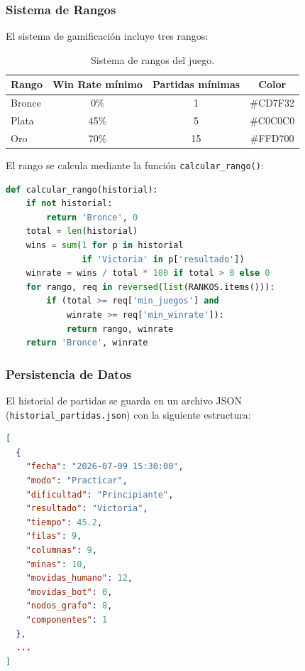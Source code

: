 \documentclass[12pt,a4paper]{article}
\begin{document}
\subsubsection{Sistema de Rangos}

El sistema de gamificación incluye tres rangos:

\begin{table}[H]
\centering
\caption{Sistema de rangos del juego.}
\label{tab:rangos}
\begin{tabular}{lccc}
\toprule
\textbf{Rango} & \textbf{Win Rate mínimo} & \textbf{Partidas mínimas} & \textbf{Color} \\
\midrule
Bronce & 0\% & 1 & \#CD7F32 \\
Plata & 45\% & 5 & \#C0C0C0 \\
Oro & 70\% & 15 & \#FFD700 \\
\bottomrule
\end{tabular}
\end{table}

El rango se calcula mediante la función \texttt{calcular\_rango()}:

\begin{lstlisting}[language=Python, caption={Cálculo del rango del jugador.}]
def calcular_rango(historial):
    if not historial:
        return 'Bronce', 0
    total = len(historial)
    wins = sum(1 for p in historial
               if 'Victoria' in p['resultado'])
    winrate = wins / total * 100 if total > 0 else 0
    for rango, req in reversed(list(RANKOS.items())):
        if (total >= req['min_juegos'] and
            winrate >= req['min_winrate']):
            return rango, winrate
    return 'Bronce', winrate
\end{lstlisting}

\subsubsection{Persistencia de Datos}

El historial de partidas se guarda en un archivo JSON (\texttt{historial\_partidas.json}) con la siguiente estructura:

\begin{lstlisting}[language=JSON, caption={Estructura del historial de partidas.}]
[
  {
    "fecha": "2026-07-09 15:30:00",
    "modo": "Practicar",
    "dificultad": "Principiante",
    "resultado": "Victoria",
    "tiempo": 45.2,
    "filas": 9,
    "columnas": 9,
    "minas": 10,
    "movidas_humano": 12,
    "movidas_bot": 0,
    "nodos_grafo": 8,
    "componentes": 1
  },
  ...
]
\end{lstlisting}
\end{document}
